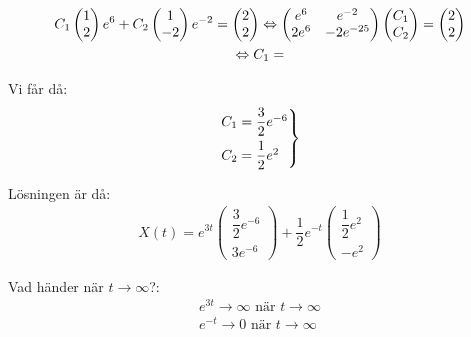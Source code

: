 \begin{equation*}
  \begin{gathered}
    C_1\begin{pmatrix}1\\2\end{pmatrix}e^6 + C_2\begin{pmatrix}1\\-2\end{pmatrix}e^{-2} = \begin{pmatrix}2\\2\end{pmatrix}\Leftrightarrow\begin{pmatrix}e^6&e^{-2}\\2e^{6}&-2e^{-25}\end{pmatrix}\begin{pmatrix}C_1\\C_2\end{pmatrix} = \begin{pmatrix}2\\2\end{pmatrix}\\
    \Leftrightarrow C_1 = 
  \end{gathered}
\end{equation*}
\par\bigskip
\noindent Vi får då:
\begin{equation*}
  \begin{gathered}
    \begin{rcases*}
      C_1 = \dfrac{3}{2}e^{-6}\\
      C_2 = \dfrac{1}{2}e^2
    \end{rcases*}
  \end{gathered}
\end{equation*}
\par\bigskip
\noindent Lösningen är då:
\begin{equation*}
  \begin{gathered}
    X(t)=e^{3t}\begin{pmatrix}\dfrac{3}{2}e^{-6}\\3e^{-6}\end{pmatrix}+\dfrac{1}{2}e^{-t}\begin{pmatrix}\dfrac{1}{2}e^{2}\\-e^2\end{pmatrix}
  \end{gathered}
\end{equation*}
\par\bigskip
\noindent Vad händer när $t\to\infty$?:
\begin{equation*}
  \begin{gathered}
    e^{3t}\to\infty\text{ när }t\to\infty\\
    e^{-t}\to0\text{ när }t\to\infty
  \end{gathered}
\end{equation*}

